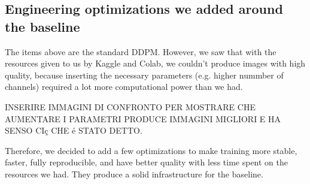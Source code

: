 \documentclass[11pt]{article}
\begin{document}
\subsection{Engineering optimizations we added around the baseline}
The items above are the standard DDPM. However, we saw that with the resources given to us by Kaggle and Colab, we couldn't produce images with high quality, because inserting the necessary parameters (e.g. higher nummber of channels) required a lot more computational power than we had.

INSERIRE IMMAGINI DI CONFRONTO PER MOSTRARE CHE AUMENTARE I PARAMETRI PRODUCE IMMAGINI MIGLIORI E HA SENSO CIç CHE é STATO DETTO.

Therefore, we decided to add a few optimizations to
make training more stable, faster, fully reproducible, and have better quality with less time spent on the resources we had. They produce a solid infrastructure for the baseline.
\end{document}
